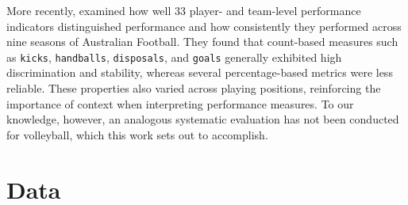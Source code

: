 \documentclass[10pt]{article}
\begin{document}
More recently, \citet{matteo_understanding_2026} examined how well 33 player- and team-level performance indicators distinguished performance and how consistently they performed across nine seasons of Australian Football.
They found that count-based measures such as \texttt{kicks}, \texttt{handballs}, \texttt{disposals}, and \texttt{goals} generally exhibited high discrimination and stability, whereas several percentage-based metrics were less reliable.
These properties also varied across playing positions, reinforcing the importance of context when interpreting performance measures.
To our knowledge, however, an analogous systematic evaluation has not been conducted for volleyball, which this work sets out to accomplish.


\section{Data}
\end{document}

